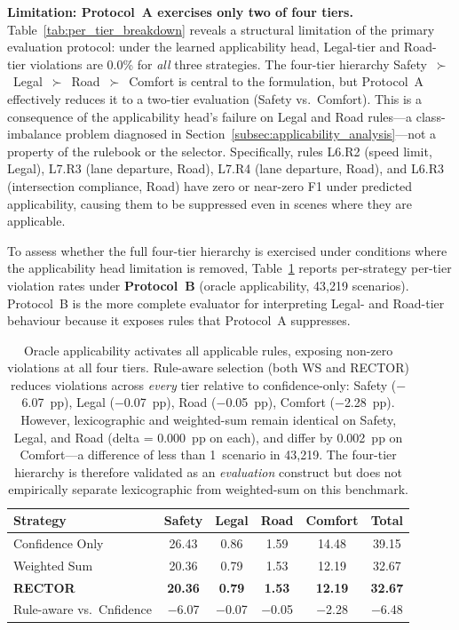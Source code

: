 \noindent\textbf{Limitation: Protocol~A exercises only two of four tiers.}
Table~\ref{tab:per_tier_breakdown} reveals a structural limitation of the primary evaluation protocol: under the learned applicability head, Legal-tier and Road-tier violations are 0.0\% for \emph{all} three strategies.  The four-tier hierarchy Safety~$\succ$~Legal~$\succ$~Road~$\succ$~Comfort is central to the formulation, but Protocol~A effectively reduces it to a two-tier evaluation (Safety vs.\ Comfort).  This is a consequence of the applicability head's failure on Legal and Road rules---a class-imbalance problem diagnosed in Section~\ref{subsec:applicability_analysis}---not a property of the rulebook or the selector.  Specifically, rules L6.R2 (speed limit, Legal), L7.R3 (lane departure, Road), L7.R4 (lane departure, Road), and L6.R3 (intersection compliance, Road) have zero or near-zero F1 under predicted applicability, causing them to be suppressed even in scenes where they are applicable.

To assess whether the full four-tier hierarchy is exercised under conditions where the applicability head limitation is removed, Table~\ref{tab:per_tier_oracle} reports per-strategy per-tier violation rates under \textbf{Protocol~B} (oracle applicability, 43{,}219 scenarios).  Protocol~B is the more complete evaluator for interpreting Legal- and Road-tier behaviour because it exposes rules that Protocol~A suppresses.

\begin{table}[t]
\centering
\caption{Per-Tier Violation Rates by Selection Strategy (\%, Protocol~B, Oracle Applicability, 43{,}219 Scenarios)}
\label{tab:per_tier_oracle}
\setlength{\tabcolsep}{3pt}
\begin{tabular}{lccccc}
\toprule
\textbf{Strategy} & \textbf{Safety} & \textbf{Legal} & \textbf{Road} & \textbf{Comfort} & \textbf{Total} \\
\midrule
Confidence Only & 26.43 & 0.86 & 1.59 & 14.48 & 39.15 \\
Weighted Sum    & 20.36 & 0.79 & 1.53 & 12.19 & 32.67 \\
\textbf{RECTOR} & \textbf{20.36} & \textbf{0.79} & \textbf{1.53} & \textbf{12.19} & \textbf{32.67} \\
\midrule
Rule-aware vs.\ Cnfidence & $-$6.07 & $-$0.07 & $-$0.05 & $-$2.28 & $-$6.48 \\
\bottomrule
\end{tabular}
\vspace{1mm}
\caption*{\footnotesize Oracle applicability activates all applicable rules, exposing non-zero violations at all four tiers.  Rule-aware selection (both WS and RECTOR) reduces violations across \emph{every} tier relative to confidence-only: Safety ($-$6.07~pp), Legal ($-$0.07~pp), Road ($-$0.05~pp), Comfort ($-$2.28~pp).  However, lexicographic and weighted-sum remain identical on Safety, Legal, and Road (delta = 0.000~pp on each), and differ by 0.002~pp on Comfort---a difference of less than 1~scenario in 43{,}219.  The four-tier hierarchy is therefore validated as an \emph{evaluation} construct but does not empirically separate lexicographic from weighted-sum on this benchmark.}
\end{table}

